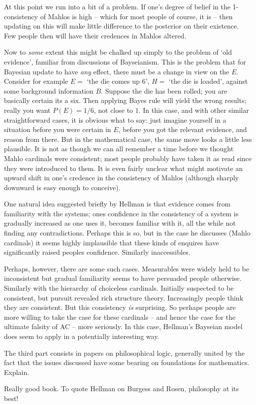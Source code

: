 \documentclass{asl}
\theoremstyle{definition}
\begin{document}
At this point we run into a bit of a problem. If one's degree of belief in the 1-consistency of Mahlos is high -- which for most people of course, it is -- then updating on this will make little difference to the posterior on their existence. Few people then will have their credences in Mahlos altered.

Now to \emph{some} extent this might be chalked up simply to the problem of `old evidence', familiar from discussions of Bayseianism. This is the problem that for Bayesian update to have \emph{any} effect, there must be a change in view on the $E$. Consider for example $E =$ `the die comes up 6', $H =$ `the die is loaded', against some background information $B$. Suppose the die has been rolled; you are basically certain its a six. Then applying Bayes rule will yield the wrong results; really you want $P(E) = 1/6$, not close to $1$. In this case, and with other similar straightforward cases, it is obvious what to say: just imagine yourself in a situation before you were certain in $E$, before you got the relevant evidence, and reason from there. But in the mathematical case, the same move looks a little less plausible. It is not as though we can all remember a time before we thought Mahlo cardinals were consistent; most people probably have taken it as read since they were introduced to them. It is even fairly unclear what might motivate an upward shift in one's credence in the consistency of Mahlos (although sharply downward is easy enough to conceive).

One natural idea suggested briefly by Hellman is that evidence comes from familiarity with the systems; ones confidence in the consistency of a system is gradually increased as one uses it, becomes familiar with it, all the while not finding any contradictions. Perhaps this is so, but in the case he discusses (Mahlo cardinals) it seems highly implausible that these kinds of enquires have significantly raised peoples confidence. Similarly inaccessibles.

Perhaps, however, there are some such cases. Measurables were widely held to be inconsistent but gradual familiarity seems to have persuaded people otherwise. Similarly with the hierarchy of choiceless cardinals. Initially suspected to be consistent, but pursuit revealed rich structure theory. Increasingly people think they are consistent. But this consistency \emph{is} surprising. So perhaps people are more willing to take the case for these cardinals -- and hence the case for the ultimate falsity of AC -- more seriously. In this case, Hellman's Bayseian model does seem to apply in a potentially interesting way.



The third part consists in papers on philosophical logic, generally united by the fact that the issues discussed have some bearing on foundations for mathematics. Explain.

Really good book. To quote Hellman on Burgess and Rosen, philosophy at its best!



%
\end{document}
